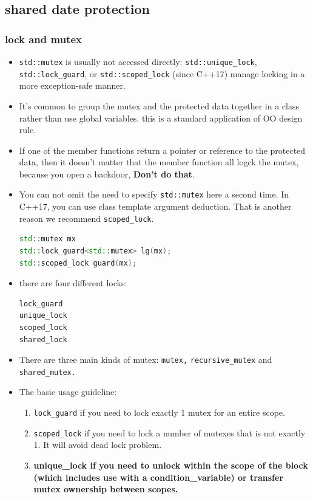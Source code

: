 \documentclass[a4paper,11pt,twoside]{book}
\begin{document}
\subsection{shared date protection}
\subsubsection{lock and mutex}

\begin{itemize}
	\item \texttt{std::mutex} is usually not accessed directly: \texttt{std::unique\_lock}, \texttt{std::lock\_guard}, or \texttt{std::scoped\_lock} (since C++17) manage locking in a more exception-safe manner.
	
	\item It's common to group the mutex and the protected data together in a class rather than use global variables. this is a standard application of OO design rule.
	
	\item If one of the member functions return a pointer or reference to the protected data, then it doesn't matter that the member function all logck the mutex, because you open a backdoor, \textbf{Don't do that}. 
	
	\item You can not omit the need to specify \texttt{std::mutex} here a second time. In C++17, you can use class template argument deduction. That is another reason we recommend \texttt{scoped\_lock}.
	
\begin{lstlisting}[frame=single, language=c++]
std::mutex mx
std::lock_guard<std::mutex> lg(mx);
std::scoped_lock guard(mx);
\end{lstlisting}

	\item there are four different locks:
\begin{lstlisting}[frame=single, language=c++]	
lock_guard
unique_lock
scoped_lock
shared_lock	
\end{lstlisting}

		\item There are three main kinds of mutex: \texttt{mutex,} \texttt{recursive\_mutex} and \texttt{shared\_mutex.}

	\item The basic usage guideline:
\begin{enumerate}
	\item \texttt{lock\_guard} if you need to lock exactly 1 mutex for an entire scope.
	\item \texttt{scoped\_lock} if you need to lock a number of mutexes that is not exactly 1. It will avoid dead lock problem.
	\item \textbf{unique\_lock if you need to unlock within the scope of the block (which includes use with a condition\_variable) or transfer mutex ownership between scopes.}
\end{enumerate}


\end{itemize}
\end{document}
